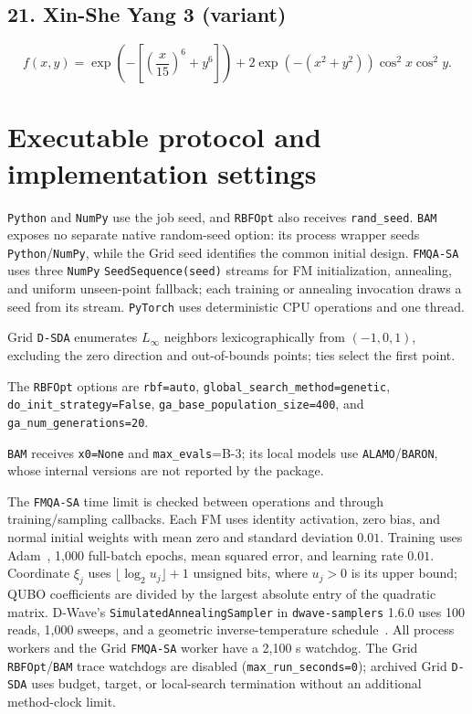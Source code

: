\subsection*{21. Xin-She Yang 3 (variant)}
\begin{equation}\label{eq:supp-xin}
f(x,y)=\exp\!\left(-\left[\left(\frac{x}{15}\right)^6+y^6\right]\right)
+2\exp\!\left(-(x^2+y^2)\right)\cos^2x\cos^2y.
\end{equation}

\FloatBarrier %
\section{Executable protocol and implementation settings}\label{sec:supp-protocol}

\texttt{Python} and \texttt{NumPy} use the job seed, and \texttt{RBFOpt} also receives \nolinkurl{rand_seed}.
\texttt{BAM} exposes no separate native random-seed option: its process wrapper seeds \texttt{Python}/\texttt{NumPy}, while the Grid seed identifies the common initial design.
\texttt{FMQA-SA} uses three \texttt{NumPy} \nolinkurl{SeedSequence(seed)} streams for FM initialization, annealing, and uniform unseen-point fallback; each training or annealing invocation draws a seed from its stream.
\texttt{PyTorch} uses deterministic CPU operations and one thread.

Grid \texttt{D-SDA} enumerates \(L_\infty\) neighbors lexicographically from \((-1,0,1)\), excluding the zero direction and out-of-bounds points; ties select the first point.

The \texttt{RBFOpt} options are \nolinkurl{rbf=auto}, \nolinkurl{global_search_method=genetic}, \nolinkurl{do_init_strategy=False}, \nolinkurl{ga_base_population_size=400}, and \nolinkurl{ga_num_generations=20}.

\texttt{BAM} receives \nolinkurl{x0=None} and \nolinkurl{max_evals}=B-3; its local models use \texttt{ALAMO}/\texttt{BARON}, whose internal versions are not reported by the package.

The \texttt{FMQA-SA} time limit is checked between operations and through training/sampling callbacks.
Each FM uses identity activation, zero bias, and normal initial weights with mean zero and standard deviation \(0.01\).
Training uses Adam~\citep{kingma2015adam}, 1,000 full-batch epochs, mean squared error, and learning rate \(0.01\).
Coordinate \(\xi_j\) uses \(\lfloor\log_2 u_j\rfloor+1\) unsigned bits, where \(u_j>0\) is its upper bound; QUBO coefficients are divided by the largest absolute entry of the quadratic matrix.
D-Wave's \texttt{SimulatedAnnealingSampler} in \texttt{dwave-samplers} 1.6.0 uses 100 reads, 1,000 sweeps, and a geometric inverse-temperature schedule~\citep{dwaveSamplers}.
All process workers and the Grid \texttt{FMQA-SA} worker have a 2,100 s watchdog.
The Grid \texttt{RBFOpt}/\texttt{BAM} trace watchdogs are disabled (\nolinkurl{max_run_seconds=0}); archived Grid \texttt{D-SDA} uses budget, target, or local-search termination without an additional method-clock limit.

